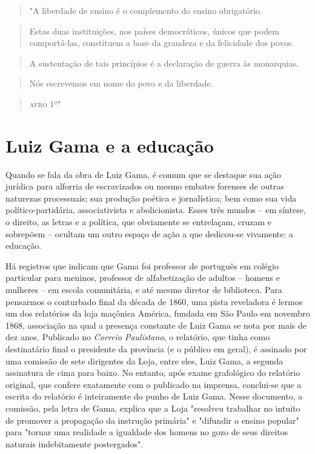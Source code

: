 \begin{quote}
"A liberdade de ensino é o complemento do ensino obrigatório.
\end{quote}

\begin{quote}
Estas duas instituições, nos países democráticos, únicos que podem
comportá-las, constituem a base da grandeza e da felicidade dos povos.
\end{quote}

\begin{quote}
A sustentação de tais princípios é a declaração de guerra às monarquias.
\end{quote}

\begin{quote}
Nós escrevemos em nome do povo e da liberdade.
\end{quote}
\begin{flushright}
\begin{quote}
\textsc{afro} 1º"
\end{quote}
\end{flushright}
\section{Luiz Gama e a educação}

Quando se fala da obra de Luiz Gama, é comum que se destaque sua ação
jurídica para alforria de escravizados ou mesmo embates forenses de
outras naturezas processuais; sua produção poética e jornalística; bem
como sua vida político-partidária, associativista e abolicionista. Esses
três mundos -- em síntese, o direito, as letras e a política, que
obviamente se entrelaçam, cruzam e sobrepõem -- ocultam um outro espaço
de ação a que dedicou-se vivamente: a educação.

Há registros que indicam que Gama foi professor de português em colégio
particular para meninos, professor de alfabetização de adultos -- homens
e mulheres -- em escola comunitária, e até mesmo diretor de biblioteca.
Para pensarmos o conturbado final da década de 1860, uma pista
reveladora é lermos um dos relatórios da loja maçônica América, fundada
em São Paulo em novembro 1868, associação na qual a presença constante
de Luiz Gama se nota por mais de dez anos. Publicado no \emph{Correio
Paulistano}, o relatório, que tinha como destinatário final o presidente
da província (e o público em geral), é assinado por uma comissão de sete
dirigentes da Loja, entre eles, Luiz Gama, a segunda assinatura de cima
para baixo. No entanto, após exame grafológico do relatório original,
que confere exatamente com o publicado na imprensa, conclui-se que a
escrita do relatório é inteiramente do punho de Luiz Gama. Nesse
documento, a comissão, pela letra de Gama, explica que a Loja "resolveu
trabalhar no intuito de promover a propagação da instrução primária" e
"difundir o ensino popular" para "tornar uma realidade a igualdade dos
homens no gozo de seus direitos naturais indebitamente postergados".

